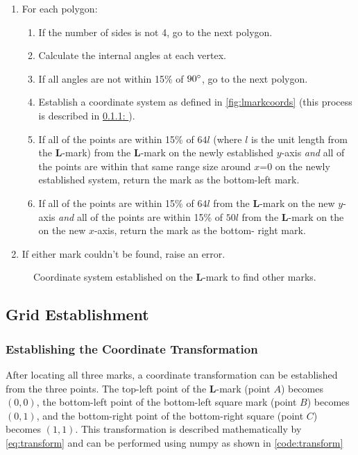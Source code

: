 \documentclass[12pt, letterpaper]{report}
\newcommand*{\sectref}[1]{\hyperref[{#1}]{\ref*{#1}: \nameref*{#1}}}
\newcommand*{\itemref}[1]{\hyperref[{#1}]{\autoref*{#1}}}
\newcommand*{\boxedimage}[1]{\fbox{\texttt{[image: img/\#1]}}}
\newcommand{\fig}[3]{
  \begin{figure}[!htbp]
    \caption{#1}
    \label{#3}
    \centering
    \boxedimage{#2}
  \end{figure}
}
\begin{document}
\begin{enumerate}
  \item For each polygon:
    \begin{enumerate}
      \item If the number of sides is not 4, go to the next polygon.
      \item Calculate the internal angles at each vertex.
      \item If all angles are not within 15\% of $90\degree$, go to the next polygon.
      \item Establish a coordinate system as defined in \itemref{fig:lmarkcoords} (this process is described in \sectref{sect:coordsystem}).
      \item If all of the points are within 15\% of $64l$ (where $l$ is the unit
      length from the \textbf{L}-mark) from the \textbf{L}-mark on the newly established
      $y$-axis \textit{and} all of the points are within that same range size
      around $x$=0 on the newly established system, return the mark as the
      bottom-left mark.
      \item If all of the points are within 15\% of $64l$ from the \textbf{L}-mark on the
      new $y$-axis \textit{and} all of the points are within 15\% of $50l$ from
      the \textbf{L}-mark on the on the new $x$-axis, return the mark as the bottom-
      right mark.
    \end{enumerate}
  \item If either mark couldn't be found, raise an error.
\end{enumerate}

\fig{Coordinate system established on the \textbf{L}-mark to find other marks.}{coords.png}{fig:lmarkcoords}

\subsection{Grid Establishment}
\subsubsection{Establishing the Coordinate Transformation}
\label{sect:coordsystem}
After locating all three marks, a coordinate transformation can be established from the
three points. The top-left point of the \textbf{L}-mark (point $A$) becomes $(0,0)$, the bottom-left
point of the bottom-left square mark (point $B$) becomes ${(0,1)}$, and the bottom-right point of the
bottom-right square (point $C$) becomes $(1,1)$. This transformation is described
mathematically by \itemref{eq:transform} and can be performed using numpy as
shown in \itemref{code:transform} 
\end{document}
